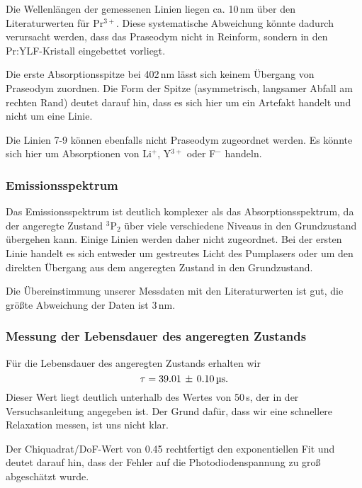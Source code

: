 Die Wellenlängen der gemessenen Linien liegen ca. 10\,nm über den Literaturwerten für Pr$^{3+}$.
Diese systematische Abweichung könnte dadurch verursacht werden,
dass das Praseodym nicht in Reinform, sondern in den Pr:YLF-Kristall eingebettet vorliegt.

Die erste Absorptionsspitze bei 402\,nm lässt sich keinem Übergang von Praseodym zuordnen.
Die Form der Spitze (asymmetrisch, langsamer Abfall am rechten Rand) deutet darauf hin,
dass es sich hier um ein Artefakt handelt und nicht um eine Linie.

Die Linien 7-9 können ebenfalls nicht Praseodym zugeordnet werden.
Es könnte sich hier um Absorptionen von Li$^+$, Y$^{3+}$ oder F$^-$ handeln.



\FloatBarrier

\subsubsection{Emissionsspektrum}

Das Emissionsspektrum ist deutlich komplexer als das Absorptionsspektrum,
da der angeregte Zustand $^3$P$_2$ über viele verschiedene Niveaus in den Grundzustand übergehen
kann.
Einige Linien werden daher nicht zugeordnet.
Bei der ersten Linie handelt es sich entweder um gestreutes Licht des Pumplasers oder um den
direkten Übergang aus dem angeregten Zustand in den Grundzustand.

Die Übereinstimmung unserer Messdaten mit den Literaturwerten ist gut,
die größte Abweichung der Daten ist 3\,nm.



\subsubsection{Messung der Lebensdauer des angeregten Zustands}

Für die Lebensdauer des angeregten Zustands erhalten wir
\begin{equation*}
\tau = 39.01\,\pm\,0.10\,\text{\textmu s}.
\end{equation*}
Dieser Wert liegt deutlich unterhalb des Wertes von 50\,\textmu s,
der in der Versuchsanleitung angegeben ist.
Der Grund dafür, dass wir eine schnellere Relaxation messen, ist uns nicht klar.

Der Chiquadrat/DoF-Wert von 0.45 rechtfertigt den exponentiellen Fit und deutet darauf hin,
dass der Fehler auf die Photodiodenspannung zu groß abgeschätzt wurde.

